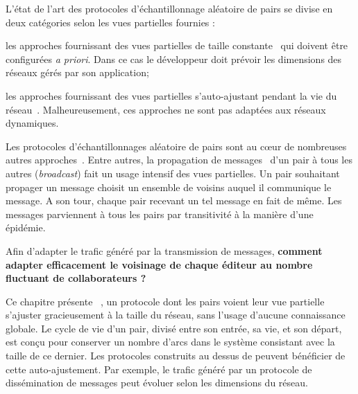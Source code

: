 
L'état de l'art des protocoles d'échantillonnage aléatoire de pairs se divise en
deux catégories selon les vues partielles fournies :
\begin{inparaenum}[(i)]
\item les approches fournissant des vues partielles de taille
  constante~\cite{eugster2003lightweight, leitao2007dependable,
    tolgyeski2009adaptive, voulgaris2005cyclon} qui doivent être configurées
  \emph{a priori}. Dans ce cas le développeur doit prévoir les dimensions des
  réseaux gérés par son application;
\item les approches fournissant des vues partielles s'auto-ajustant pendant la
  vie du réseau~\cite{ganesh2001scamp, ganesh2003peer}. Malheureusement, ces
  approches ne sont pas adaptées aux réseaux dynamiques.
\end{inparaenum}

Les protocoles d'échantillonnages aléatoire de pairs sont au cœur de nombreuses
autres approches~\cite{folz2016cyclades, jelasity2009tman,
  krasikova2016distributed, voulgaris2013vicinity}. Entre autres, la propagation
de messages~\cite{birman1999bimodal, kermarrec2003probabilistic} d'un pair à
tous les autres (\emph{broadcast}) fait un usage intensif des vues
partielles. Un pair souhaitant propager un message choisit un ensemble de
voisins auquel il communique le message. A son tour, chaque pair recevant un tel
message en fait de même. Les messages parviennent à tous les pairs par
transitivité à la manière d'une épidémie.

Afin d'adapter le trafic généré par la transmission de messages, \textbf{comment
  adapter efficacement le voisinage de chaque éditeur au nombre fluctuant de
  collaborateurs ?}

Ce chapitre présente \SPRAY~\cite{nedelec2015spray}, un protocole dont les pairs
voient leur vue partielle s'ajuster gracieusement à la taille du réseau, sans
l'usage d'aucune connaissance globale. Le cycle de vie d'un pair, divisé entre
son entrée, sa vie, et son départ, est conçu pour conserver un nombre d'arcs
dans le système consistant avec la taille de ce dernier. Les protocoles
construits au dessus de \SPRAY peuvent bénéficier de cette auto-ajustement. Par
exemple, le trafic généré par un protocole de dissémination de messages peut
évoluer selon les dimensions du réseau.

